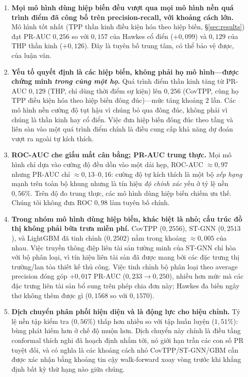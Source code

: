 \documentclass[11pt,a4paper]{article}
\begin{document}
\begin{enumerate}
    \item \textbf{Mọi mô hình dùng hiệp biến đều vượt qua mọi mô hình nền quá trình điểm đã công bố trên precision-recall, với khoảng cách lớn.} Mô hình tốt nhất (TPP thần kinh điều kiện hóa theo hiệp biến, \S\ref{sec:results}) đạt PR-AUC $0{,}256$ so với $0{,}157$ của Hawkes cổ điển ($+0{,}099$) và $0{,}129$ của THP thần kinh ($+0{,}126$). Đây là tuyên bố trung tâm, có thể bảo vệ được, của luận văn.
    \item \textbf{Yếu tố quyết định là các hiệp biến, không phải họ mô hình---được chứng minh \emph{trong cùng một họ}.} Quá trình điểm thần kinh tăng từ PR-AUC $0{,}129$ (THP, chỉ dùng thời điểm sự kiện) lên $0{,}256$ (CovTPP, cùng họ TPP điều kiện hóa theo hiệp biến đông đúc)---mức tăng khoảng $2$ lần. Các mô hình nền cường độ tụt hậu vì chúng bỏ qua đông đúc, không phải vì chúng là thần kinh hay cổ điển. Việc đưa hiệp biến đông đúc theo tầng và liên sàn vào một quá trình điểm chính là điều cung cấp khả năng dự đoán vượt ra ngoài tự kích thích.
    \item \textbf{ROC-AUC che giấu mất cân bằng; PR-AUC trung thực.} Mọi mô hình chỉ dựa vào cường độ đều dồn vào một dải hẹp, ROC-AUC $\approx 0{,}97$ nhưng PR-AUC chỉ $\approx 0{,}13$--$0{,}16$: cường độ tự kích thích là một bộ \emph{xếp hạng} mạnh trên toàn bộ khung nhưng là tín hiệu \emph{độ chính xác} yếu ở tỷ lệ nền $0{,}56\%$. Trên độ đo trung thực, các mô hình dùng hiệp biến chiếm ưu thế. Chúng tôi không đưa ROC $0{,}98$ làm tuyên bố chính.
    \item \textbf{Trong nhóm mô hình dùng hiệp biến, khác biệt là nhỏ; cấu trúc đồ thị không phải bữa trưa miễn phí.} CovTPP ($0{,}2556$), ST-GNN ($0{,}2513$), và LightGBM đã tinh chỉnh ($0{,}2502$) nằm trong khoảng $\approx 0{,}005$ của nhau. Việc truyền thông điệp liên tài sản tường minh của ST-GNN chỉ hòa với bộ phân loại, vì tín hiệu liên tài sản đã được mang bởi các đặc trưng thị trường/lan tỏa thiết kế thủ công. Việc tinh chỉnh bộ phân loại theo average precision đóng góp $+0{,}017$ PR-AUC ($0{,}233\to0{,}250$), nhiều hơn mức mà các đặc trưng liên tài sản bổ sung trên phép chia đơn này; Hawkes đa biến ngây thơ không thêm được gì ($0{,}1568$ so với $0{,}1570$).
    \item \textbf{Dịch chuyển phân phối hiện diện và là động lực cho hiệu chỉnh.} Tỷ lệ nền tập kiểm tra ($0{,}56\%$) thấp hơn nhiều so với tập huấn luyện ($1{,}51\%$): bùng phát hiếm hơn ở chế độ muộn hơn. Dịch chuyển này chính là điều tầng conformal thích nghi đã hoạch định nhắm tới, nó giới hạn trần các con số PR tuyệt đối, và có nghĩa là các khoảng cách nhỏ CovTPP/ST-GNN/GBM cần được xác nhận bằng khoảng tin cậy walk-forward xoay vòng trước khi khẳng định bất kỳ thứ hạng nào giữa chúng.
\end{enumerate}
\end{document}
